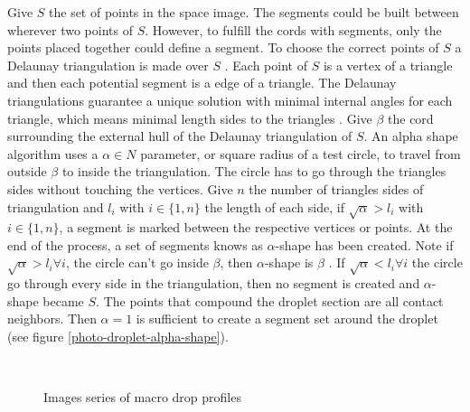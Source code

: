 \documentclass[12pt]{iopart}
\begin{document}
                
Give $S$ the set of points in the space image. The segments could 
be built between wherever two points of $S$. However, to fulfill
 the cords with segments, only the points placed together could define
 a segment. To choose the correct points of $S$ a Delaunay triangulation
 is made over $S$ \cite{CGAL}. Each point of $S$ is a vertex
of a triangle and then each potential segment is a edge of a triangle. 
The Delaunay triangulations guarantee a unique solution with minimal
 internal angles for each triangle, which means  minimal
 length sides to the triangles \cite{GEOMETRICAL}.
 Give $\beta$ the cord surrounding the external hull of the Delaunay
 triangulation of $S$. An alpha shape algorithm uses a $\alpha \in N$ parameter,
 or square radius of a test circle, to travel from outside $\beta$ to inside
 the triangulation. The circle has to go through the triangles sides without touching the vertices. Give 
$n$ the number of triangles sides of triangulation
and $l_{i}$ with $i\in\{1,n\}$ the length of each side, if $\sqrt{\alpha} > l_{i}$ 
with $i \in\{1,n\}$, a segment is marked between the respective vertices or
 points. At the end of the process, a  set of segments knows as $\alpha$-shape has been created.
  Note if $\sqrt{\alpha} > l_{i} \forall i$, the circle can't go inside $\beta$, then $\alpha$-shape
 is $\beta$ \cite{CGAL}. If $\sqrt{\alpha} < l_{i} \forall i$ the circle go through
 every side in the triangulation,  then no segment is created and $\alpha$-shape
 became $S$. The points that compound the droplet section are all contact neighbors. Then $\alpha = 1$
 is sufficient to create a segment set around the droplet
 (see figure \ref{photo-droplet-alpha-shape}). 
                                  
\begin{figure}[h!]
\begin{center}    
\\
\end{center}
\caption{{\small Images series of macro drop profiles}}
\label{photo-results-droplet}
\end{figure}
\end{document}

